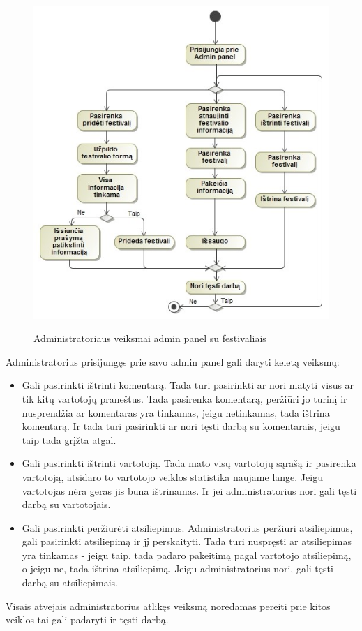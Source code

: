 ﻿\documentclass{VUMIFPSkursinis}
\begin{document}
\begin{figure}[H]
	\centering
    \includegraphics[scale=0.5]{img/Pav/AdminFest}
	\label{uml:26}
	\caption{Administratoriaus veiksmai admin panel su festivaliais}
\end{figure}

Administratorius prisijungęs prie savo admin panel gali daryti keletą veiksmų:
\begin{itemize}
\item Gali pasirinkti ištrinti komentarą. Tada turi pasirinkti ar nori matyti visus ar tik kitų vartotojų praneštus. Tada pasirenka komentarą, peržiūri jo turinį ir nusprendžia ar komentaras yra tinkamas, jeigu netinkamas, tada ištrina komentarą. Ir tada turi pasirinkti ar nori tęsti darbą su komentarais, jeigu taip tada grįžta atgal.
\item Gali pasirinkti ištrinti vartotoją. Tada mato visų vartotojų sąrašą ir pasirenka vartotoją, atsidaro to vartotojo veiklos statistika naujame lange. Jeigu vartotojas nėra geras jis būna ištrinamas. Ir jei administratorius nori gali tęsti darbą su vartotojais.
\item Gali pasirinkti peržiūrėti atsiliepimus. Administratorius peržiūri atsiliepimus, gali pasirinkti atsiliepimą ir jį perskaityti. Tada turi nuspręsti ar atsiliepimas yra tinkamas - jeigu taip, tada padaro pakeitimą pagal vartotojo atsiliepimą, o jeigu ne, tada ištrina atsiliepimą. Jeigu administratorius nori, gali tęsti darbą su atsiliepimais.
\end{itemize}
Visais atvejais administratorius atlikęs veiksmą norėdamas pereiti prie kitos veiklos tai gali padaryti ir tęsti darbą.
\end{document}
